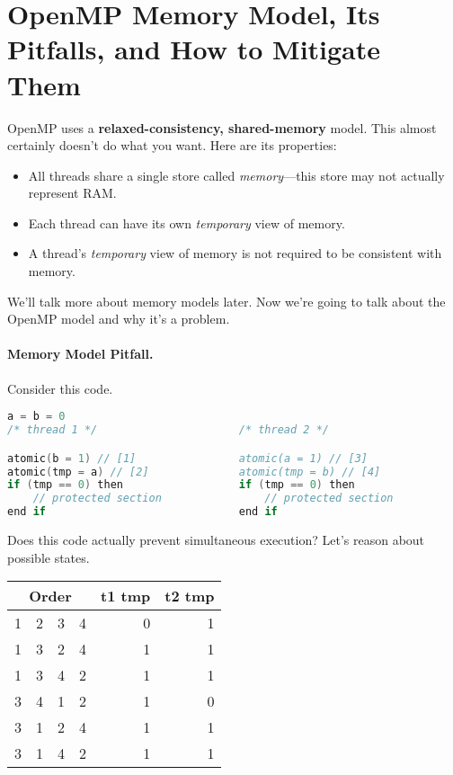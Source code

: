 




\section*{OpenMP Memory Model, Its Pitfalls, and How to Mitigate Them}
OpenMP uses a {\bf relaxed-consistency, shared-memory} model. This almost certainly doesn't 
do what you want. Here are its properties:

\begin{itemize}
    \item All threads share a single store called
      \emph{memory}---this store may not actually represent RAM.
    \item Each thread can have its own {\it temporary} view of memory.
    \item A thread's {\it temporary} view of memory is not required to be
      consistent with memory.
\end{itemize}

We'll talk more about memory models later. Now we're going to talk about 
the OpenMP model and why it's a problem.

\paragraph{Memory Model Pitfall.} Consider this code.

  \begin{lstlisting}[language=C]
                    a = b = 0
/* thread 1 */                      /* thread 2 */

atomic(b = 1) // [1]                atomic(a = 1) // [3]
atomic(tmp = a) // [2]              atomic(tmp = b) // [4]
if (tmp == 0) then                  if (tmp == 0) then
    // protected section                // protected section
end if                              end if
  \end{lstlisting}

Does this code actually prevent simultaneous execution?
Let's reason about possible states.

  \begin{center}
  \begin{tabular}{r r r r | r r}
    \multicolumn{4}{c|}{Order} & t1 tmp & t2 tmp\\
    \hline
    1 & 2 & 3 & 4 & 0 & 1\\
    1 & 3 & 2 & 4 & 1 & 1\\
    1 & 3 & 4 & 2 & 1 & 1\\
    3 & 4 & 1 & 2 & 1 & 0\\
    3 & 1 & 2 & 4 & 1 & 1\\
    3 & 1 & 4 & 2 & 1 & 1\\
  \end{tabular}
  \end{center}

